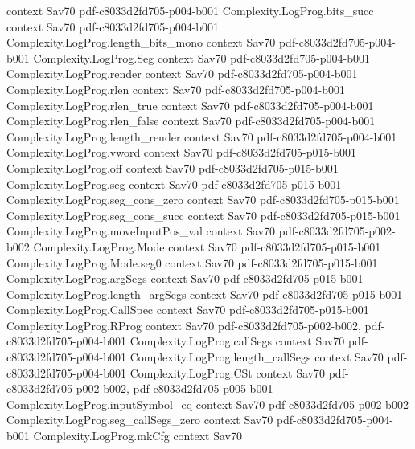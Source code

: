 \begin{theorem}
  {context}
  {Sav70}
  {pdf-c8033d2fd705-p004-b001}
\proofstep
  {Complexity.LogProg.bits_succ}
  {context}
  {Sav70}
  {pdf-c8033d2fd705-p004-b001}
\proofstep
  {Complexity.LogProg.length_bits_mono}
  {context}
  {Sav70}
  {pdf-c8033d2fd705-p004-b001}
\proofstep
  {Complexity.LogProg.Seg}
  {context}
  {Sav70}
  {pdf-c8033d2fd705-p004-b001}
\proofstep
  {Complexity.LogProg.render}
  {context}
  {Sav70}
  {pdf-c8033d2fd705-p004-b001}
\proofstep
  {Complexity.LogProg.rlen}
  {context}
  {Sav70}
  {pdf-c8033d2fd705-p004-b001}
\proofstep
  {Complexity.LogProg.rlen_true}
  {context}
  {Sav70}
  {pdf-c8033d2fd705-p004-b001}
\proofstep
  {Complexity.LogProg.rlen_false}
  {context}
  {Sav70}
  {pdf-c8033d2fd705-p004-b001}
\proofstep
  {Complexity.LogProg.length_render}
  {context}
  {Sav70}
  {pdf-c8033d2fd705-p004-b001}
\proofstep
  {Complexity.LogProg.vword}
  {context}
  {Sav70}
  {pdf-c8033d2fd705-p015-b001}
\proofstep
  {Complexity.LogProg.off}
  {context}
  {Sav70}
  {pdf-c8033d2fd705-p015-b001}
\proofstep
  {Complexity.LogProg.seg}
  {context}
  {Sav70}
  {pdf-c8033d2fd705-p015-b001}
\proofstep
  {Complexity.LogProg.seg_cons_zero}
  {context}
  {Sav70}
  {pdf-c8033d2fd705-p015-b001}
\proofstep
  {Complexity.LogProg.seg_cons_succ}
  {context}
  {Sav70}
  {pdf-c8033d2fd705-p015-b001}
\proofstep
  {Complexity.LogProg.moveInputPos_val}
  {context}
  {Sav70}
  {pdf-c8033d2fd705-p002-b002}
\proofstep
  {Complexity.LogProg.Mode}
  {context}
  {Sav70}
  {pdf-c8033d2fd705-p015-b001}
\proofstep
  {Complexity.LogProg.Mode.seg0}
  {context}
  {Sav70}
  {pdf-c8033d2fd705-p015-b001}
\proofstep
  {Complexity.LogProg.argSegs}
  {context}
  {Sav70}
  {pdf-c8033d2fd705-p015-b001}
\proofstep
  {Complexity.LogProg.length_argSegs}
  {context}
  {Sav70}
  {pdf-c8033d2fd705-p015-b001}
\proofstep
  {Complexity.LogProg.CallSpec}
  {context}
  {Sav70}
  {pdf-c8033d2fd705-p015-b001}
\proofstep
  {Complexity.LogProg.RProg}
  {context}
  {Sav70}
  {pdf-c8033d2fd705-p002-b002,
    pdf-c8033d2fd705-p004-b001}
\proofstep
  {Complexity.LogProg.callSegs}
  {context}
  {Sav70}
  {pdf-c8033d2fd705-p004-b001}
\proofstep
  {Complexity.LogProg.length_callSegs}
  {context}
  {Sav70}
  {pdf-c8033d2fd705-p004-b001}
\proofstep
  {Complexity.LogProg.CSt}
  {context}
  {Sav70}
  {pdf-c8033d2fd705-p002-b002,
    pdf-c8033d2fd705-p005-b001}
\proofstep
  {Complexity.LogProg.inputSymbol_eq}
  {context}
  {Sav70}
  {pdf-c8033d2fd705-p002-b002}
\proofstep
  {Complexity.LogProg.seg_callSegs_zero}
  {context}
  {Sav70}
  {pdf-c8033d2fd705-p004-b001}
\proofstep
  {Complexity.LogProg.mkCfg}
  {context}
  {Sav70}

\end{theorem}
